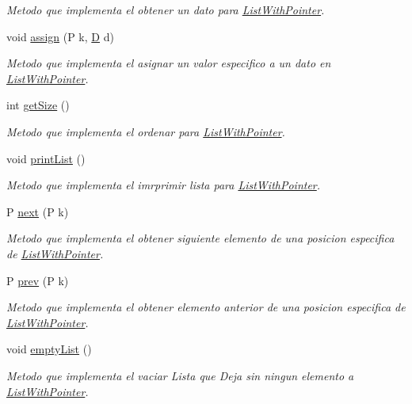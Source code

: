 \begin{DoxyCompactItemize}
\begin{DoxyCompactList}\small\item\em Metodo que implementa el obtener un dato para \hyperlink{class_list_with_pointer}{List\+With\+Pointer}. \end{DoxyCompactList}\item 
void \hyperlink{class_list_with_pointer_aeaa834b22c4d7276a77ff29df3da7a30}{assign} (P k, \hyperlink{gwp_2main_8cpp_af316c33cc298530f245e8b55330e86b5}{D} d)
\begin{DoxyCompactList}\small\item\em Metodo que implementa el asignar un valor especifico a un dato en \hyperlink{class_list_with_pointer}{List\+With\+Pointer}. \end{DoxyCompactList}\item 
int \hyperlink{class_list_with_pointer_ac70c49b5703887fd867e90cdac3c706f}{get\+Size} ()
\begin{DoxyCompactList}\small\item\em Metodo que implementa el ordenar para \hyperlink{class_list_with_pointer}{List\+With\+Pointer}. \end{DoxyCompactList}\item 
void \hyperlink{class_list_with_pointer_a7079b5f1dbddb87a7e33ffc71ebb7b92}{print\+List} ()
\begin{DoxyCompactList}\small\item\em Metodo que implementa el imrprimir lista para \hyperlink{class_list_with_pointer}{List\+With\+Pointer}. \end{DoxyCompactList}\item 
P \hyperlink{class_list_with_pointer_a518b5ee89e3ad32ae7cd4ddd5d4fa7e9}{next} (P k)
\begin{DoxyCompactList}\small\item\em Metodo que implementa el obtener siguiente elemento de una posicion especifica de \hyperlink{class_list_with_pointer}{List\+With\+Pointer}. \end{DoxyCompactList}\item 
P \hyperlink{class_list_with_pointer_a7242068fcc3a193f0f7e94517856e431}{prev} (P k)
\begin{DoxyCompactList}\small\item\em Metodo que implementa el obtener elemento anterior de una posicion especifica de \hyperlink{class_list_with_pointer}{List\+With\+Pointer}. \end{DoxyCompactList}\item 
void \hyperlink{class_list_with_pointer_aec4f5374971962c79d397bbcd0080199}{empty\+List} ()
\begin{DoxyCompactList}\small\item\em Metodo que implementa el vaciar Lista que Deja sin ningun elemento a \hyperlink{class_list_with_pointer}{List\+With\+Pointer}. \end{DoxyCompactList}\end{DoxyCompactItemize}
